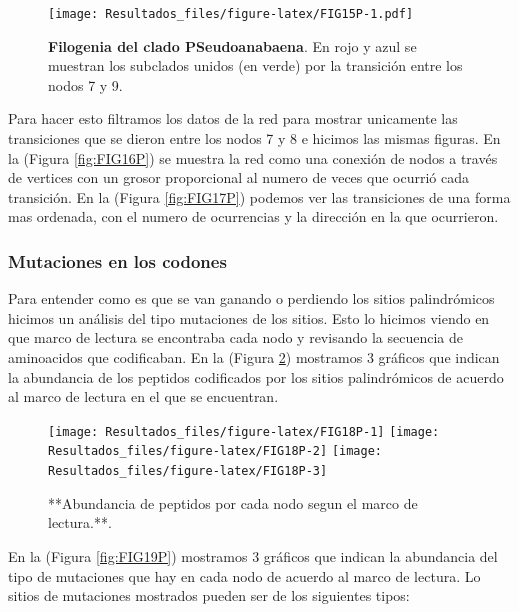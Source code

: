 \documentclass[
]{book}
\begin{document}
\begin{figure}
\centering
\texttt{[image: Resultados\_files/figure-latex/FIG15P-1.pdf]}
\caption{\label{fig:FIG15P}\textbf{Filogenia del clado PSeudoanabaena}. En rojo y azul se muestran los subclados unidos (en verde) por la transición entre los nodos 7 y 9.}
\end{figure}

Para hacer esto filtramos los datos de la red para mostrar unicamente las transiciones que se dieron entre los nodos 7 y 8 e hicimos las mismas figuras.
En la (Figura \ref{fig:FIG16P}) se muestra la red como una conexión de nodos a través de vertices con un grosor proporcional al numero de veces que ocurrió cada transición. En la (Figura \ref{fig:FIG17P}) podemos ver las transiciones de una forma mas ordenada, con el numero de ocurrencias y la dirección en la que ocurrieron.

\hypertarget{mutaciones-en-los-codones-5}{%
\subsubsection{Mutaciones en los codones}\label{mutaciones-en-los-codones-5}}

Para entender como es que se van ganando o perdiendo los sitios palindrómicos hicimos un análisis del tipo mutaciones de los sitios. Esto lo hicimos viendo en que marco de lectura se encontraba cada nodo y revisando la secuencia de aminoacidos que codificaban. En la (Figura \ref{fig:FIG18P}) mostramos 3 gráficos que indican la abundancia de los peptidos codificados por los sitios palindrómicos de acuerdo al marco de lectura en el que se encuentran.

\begin{figure}

{\centering \texttt{[image: Resultados\_files/figure-latex/FIG18P-1]} \texttt{[image: Resultados\_files/figure-latex/FIG18P-2]} \texttt{[image: Resultados\_files/figure-latex/FIG18P-3]} 

}

\caption{**Abundancia de peptidos por cada nodo segun el marco de lectura.**.}\label{fig:FIG18P}
\end{figure}

En la (Figura \ref{fig:FIG19P}) mostramos 3 gráficos que indican la abundancia del tipo de mutaciones que hay en cada nodo de acuerdo al marco de lectura. Lo sitios de mutaciones mostrados pueden ser de los siguientes tipos:
\end{document}
